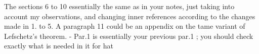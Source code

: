 The sections 6 to 10 essentially the same as in your notes, just taking into account my observations, and changing inner references according to the changes made in 1. to 5. A paragraph 11 could be an appendix on the tame variant of Lefschetz's theorem. - Par.1 is essentially your previous par.1 ; you should check exactly what is needed in it for hat
